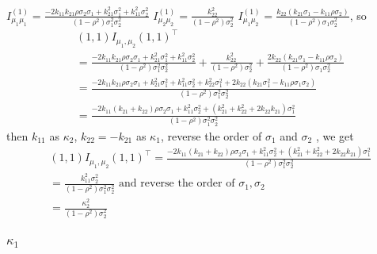 \documentclass[11pt]{article}%
\theoremstyle{definition}
\begin{document}
$I_{\mu_{1}\mu_{1}}^{\left(  1\right)  }=\frac{-2k_{11}k_{21}\rho\sigma
_{2}\sigma_{1}+k_{21}^{2}\sigma_{1}^{2}+k_{11}^{2}\sigma_{2}^{2}}{\left(
1-\rho^{2}\right)  \sigma_{1}^{2}\sigma_{2}^{2}}$ $I_{\mu_{2}\mu_{2}}^{\left(
1\right)  }=\frac{k_{22}^{2}}{\left(  1-\rho^{2}\right)  \sigma_{2}^{2}}$
$I_{\mu_{1}\mu_{2}}^{\left(  1\right)  }=\frac{k_{22}\left(  k_{21}\sigma
_{1}-k_{11}\rho\sigma_{2}\right)  }{\left(  1-\rho^{2}\right)  \sigma
_{1}\sigma_{2}^{2}}$, so%
\begin{align*}
&  (1,1)I_{\mu_{1},\mu_{2}}(1,1)^{\intercal}\\
&  =\frac{-2k_{11}k_{21}\rho\sigma_{2}\sigma_{1}+k_{21}^{2}\sigma_{1}%
^{2}+k_{11}^{2}\sigma_{2}^{2}}{\left(  1-\rho^{2}\right)  \sigma_{1}^{2}%
\sigma_{2}^{2}}+\frac{k_{22}^{2}}{\left(  1-\rho^{2}\right)  \sigma_{2}^{2}%
}+\frac{2k_{22}\left(  k_{21}\sigma_{1}-k_{11}\rho\sigma_{2}\right)  }{\left(
1-\rho^{2}\right)  \sigma_{1}\sigma_{2}^{2}}\\
&  =\frac{-2k_{11}k_{21}\rho\sigma_{2}\sigma_{1}+k_{21}^{2}\sigma_{1}%
^{2}+k_{11}^{2}\sigma_{2}^{2}+k_{22}^{2}\sigma_{1}^{2}+2k_{22}\left(
k_{21}\sigma_{1}^{2}-k_{11}\rho\sigma_{1}\sigma_{2}\right)  }{\left(
1-\rho^{2}\right)  \sigma_{1}^{2}\sigma_{2}^{2}}\\
&  =\frac{-2k_{11}(k_{21}+k_{22})\rho\sigma_{2}\sigma_{1}+k_{11}^{2}\sigma
_{2}^{2}+\left(  k_{21}^{2}+k_{22}^{2}+2k_{22}k_{21}\right)  \sigma_{1}^{2}%
}{\left(  1-\rho^{2}\right)  \sigma_{1}^{2}\sigma_{2}^{2}}%
\end{align*}
then $k_{11}$ as $\kappa_{2}$, $k_{22}=-k_{21}$ as $\kappa_{1}$, reverse the
order of $\sigma_{1}$ and $\sigma_{2}$ , we get%
\begin{align*}
&  (1,1)I_{\mu_{1},\mu_{2}}(1,1)^{\intercal}=\frac{-2k_{11}(k_{21}+k_{22}%
)\rho\sigma_{2}\sigma_{1}+k_{11}^{2}\sigma_{2}^{2}+\left(  k_{21}^{2}%
+k_{22}^{2}+2k_{22}k_{21}\right)  \sigma_{1}^{2}}{\left(  1-\rho^{2}\right)
\sigma_{1}^{2}\sigma_{2}^{2}}\\
&  =\frac{k_{11}^{2}\sigma_{2}^{2}}{\left(  1-\rho^{2}\right)  \sigma_{1}%
^{2}\sigma_{2}^{2}}\text{ and reverse the order of }\sigma_{1},\sigma_{2}\\
&  =\frac{\kappa_{2}^{2}}{\left(  1-\rho^{2}\right)  \sigma_{2}^{2}}%
\end{align*}


\subsubsection{ $\kappa_{1}$}%
\end{document}
